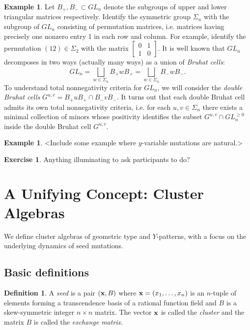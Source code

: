 \documentclass{amsart}
\theoremstyle{definition}
\newtheorem{definition}[theorem]{Definition}
\newtheorem{example}[theorem]{Example}
\newtheorem{exercise}[theorem]{Exercise}
\theoremstyle{remark}
\numberwithin{equation}{section}
\newcommand{\x}{{\bf x}}
\begin{document}
\begin{example}
    Let $B_+,B_-\subset GL_n$ denote the subgroups of upper and lower triangular matrices respectively.  Identify the symmetric group $\Sigma_n$ with the subgroup of $GL_n$ consisting of permutation matrices, i.e. matrices having precisely one nonzero entry 1 in each row and column.  For example, identify the permutation $(12)\in\Sigma_2$ with the matrix $\left[\begin{array}{cc}0 & 1\\ 1 & 0\end{array}\right]$.  It is well known that $GL_n$ decomposes in two ways (actually many ways) as a union of \emph{Bruhat cells}:
    \[GL_n=\bigsqcup_{w\in\Sigma_n}B_+w B_+=\bigsqcup_{w\in\Sigma_n}B_-w B_-.\]
    To understand total nonnegativity criteria for $GL_n$, we will consider the \emph{double Bruhat cells} $G^{u,v}=B_+uB_+\cap B_-vB_-$.  It turns out that each double Bruhat cell admits its own total nonnegativity criteria, i.e. for each $u,v\in\Sigma_n$ there exists a minimal collection of minors whose positivity identifies the subset $G^{u,v}\cap GL_n^{\ge0}$ inside the double Bruhat cell $G^{u,v}$.


  \end{example}

  \begin{example}
    <Include some example where $y$-variable mutations are natural.>
  \end{example}

  \begin{exercise}
    Anything illuminating to ask participants to do?
  \end{exercise}

\section{A Unifying Concept: Cluster Algebras}\label{sec:cluster_algebras}
	We define cluster algebras of geometric type and $Y$-patterns, with a focus on the underlying dynamics of seed mutations.
	
	\subsection{Basic definitions}

	\begin{definition}
		A \emph{seed} is a pair $(\x,B)$ where $\x = (x_1,\ldots, x_n)$ is an $n$-tuple of elements forming a transcendence basis of a rational function field and $B$ is a skew-symmetric integer $n \times n$ matrix.  The vector $\x$ is called the \emph{cluster} and the matrix $B$ is called the \emph{exchange matrix}.
	\end{definition}
  
\end{document}
